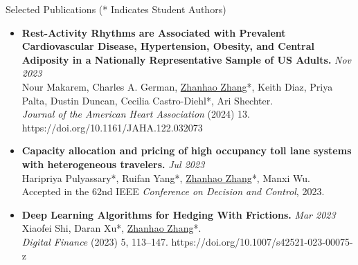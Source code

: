 \documentclass{resume} %
\begin{document}
\begin{rSection}{Selected Publications ({* Indicates Student Authors})}
\begin{itemize}
\item {\bf Rest-Activity Rhythms are Associated with Prevalent Cardiovascular Disease, Hypertension, Obesity, and Central Adiposity in a Nationally Representative Sample of US Adults.} \hfill {\em Nov 2023}\\
Nour Makarem, Charles A. German, \underline{Zhanhao Zhang}*, Keith Diaz, Priya Palta, Dustin Duncan, Cecilia Castro-Diehl*, Ari Shechter.\\
\textit{Journal of the American Heart Association} (2024) 13. https://doi.org/10.1161/JAHA.122.032073
\item {\bf Capacity allocation and pricing of high occupancy toll lane systems with heterogeneous travelers.} \hfill {\em Jul 2023}\\
Haripriya Pulyassary*, Ruifan Yang*, \underline{Zhanhao Zhang}*, Manxi Wu.\\
Accepted in the 62nd IEEE \textit{Conference on Decision and Control}, 2023.
\item {\bf Deep Learning Algorithms for Hedging With Frictions.} \hfill {\em Mar 2023}\\
Xiaofei Shi, Daran Xu*, \underline{Zhanhao Zhang}*.\\
\textit{Digital Finance} (2023) 5, 113–147. https://doi.org/10.1007/s42521-023-00075-z
\end{itemize}
\end{rSection}
\end{document}
